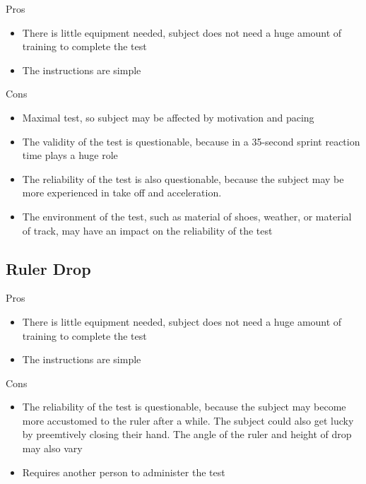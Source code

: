 \documentclass[12pt]{article}
\begin{document}
\begin{minipage}[t]{0.5\textwidth}
    \begin{center}Pros\end{center}
    \begin{itemize}
        \item There is little equipment needed, subject does not need a huge amount of training to complete the test
        \item The instructions are simple
    \end{itemize}
\end{minipage}
\begin{minipage}[t]{0.5\textwidth}
    \begin{center}Cons\end{center}
    \begin{itemize}
        \item Maximal test, so subject may be affected by motivation and pacing
        \item The validity of the test is questionable, because in a 35-second sprint reaction time plays a huge role
        \item The reliability of the test is also questionable, because the subject may be more experienced in take off and acceleration.
        \item The environment of the test, such as material of shoes, weather, or material of track, may have an impact on the reliability of the test
    \end{itemize}
\end{minipage}

\subsection*{Ruler Drop}

\begin{minipage}[t]{0.5\textwidth}
    \begin{center}Pros\end{center}
    \begin{itemize}
        \item There is little equipment needed, subject does not need a huge amount of training to complete the test
        \item The instructions are simple
    \end{itemize}
\end{minipage}
\begin{minipage}[t]{0.5\textwidth}
    \begin{center}Cons\end{center}
    \begin{itemize}
        \item The reliability of the test is questionable, because the subject may become more accustomed to the ruler after a while. The subject could also get lucky by preemtively closing their hand. The angle of the ruler and height of drop may also vary
        \item Requires another person to administer the test
    \end{itemize}
\end{minipage}
\end{document}
